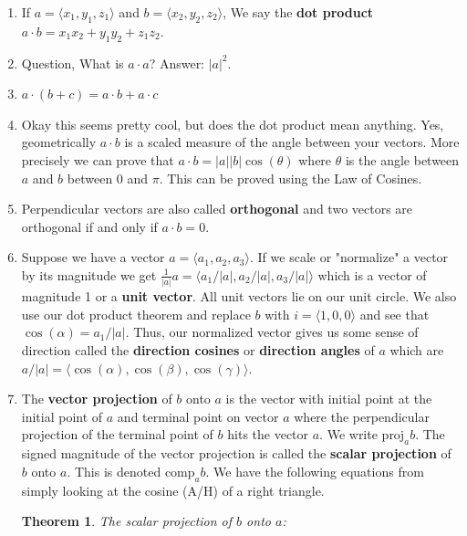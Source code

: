 \documentclass[11pt]{article}
\newtheorem{theorem}{Theorem}
\begin{document}
\begin{enumerate}

\item If $a = \langle x_1,y_1,z_1 \rangle$ and $b= \langle x_2,y_2,z_2 \rangle$, We say the \textbf{dot product} $a \cdot b = x_1x_2+y_1y_2+z_1z_2$. 

    \item Question, What is $a \cdot a$? Answer: $|a|^2$.

    \item $a \cdot (b+c) = a\cdot b + a\cdot c$

    \item  Okay this seems pretty cool, but does the dot product mean anything. Yes, geometrically $a\cdot b$ is a scaled measure of the angle between your vectors. More precisely we can prove that $a\cdot b = |a||b| \cos(\theta)$ where $\theta$ is the angle between $a$ and $b$ between 0 and $\pi$. This can be proved using the Law of Cosines.

    \item  Perpendicular vectors are also called \textbf{orthogonal} and two vectors are orthogonal if and only if $a\cdot b = 0$.

    \item  Suppose we have a vector $a= \langle a_1,a_2,a_3 \rangle$. If we scale or "normalize" a vector by its magnitude we get $\frac{1}{|a|}a = \langle a_1/|a|,a_2/|a|,a_3/|a| \rangle$ which is a vector of magnitude 1 or a \textbf{unit vector}. All unit vectors lie on our unit circle. We also use our dot product theorem and replace $b$ with $i = \langle 1,0,0 \rangle$ and see that $\cos(\alpha) = a_1/|a|$. Thus, our normalized vector gives us some sense of direction called the \textbf{direction cosines} or \textbf{direction angles} of $a$ which are $a/|a| = \langle \cos(\alpha),\cos(\beta),\cos(\gamma) \rangle$.


    \item The \textbf{vector projection} of $b$ onto $a$ is the vector with initial point at the initial point of $a$ and terminal point on vector $a$ where the perpendicular projection of the terminal point of $b$ hits the vector $a$. We write $\text{proj}_ab$. The signed magnitude of the vector projection is called the \textbf{scalar projection} of $b$ onto $a$. This is denoted $\text{comp}_ab$. We have the following equations from simply looking at the cosine (A/H) of a right triangle.

    \begin{theorem}
        The scalar projection of $b$ onto $a$: 
        

\end{theorem}
\end{enumerate}
\end{document}
